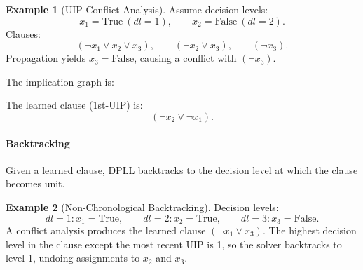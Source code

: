 \documentclass[oneside,11pt,dvipsnames]{book}
\numberwithin{equation}{section}
\theoremstyle{definition}
\newtheorem{example}{Example}[section]
\theoremstyle{remark}
\begin{document}
\begin{example}[UIP Conflict Analysis]
Assume decision levels:
\[
x_1=\mathrm{True} \ (dl=1), \qquad x_2=\mathrm{False}\ (dl=2).
\]
Clauses:
\[
(\lnot x_1 \lor x_2 \lor x_3),\qquad (\lnot x_2 \lor x_3),\qquad (\lnot x_3).
\]
Propagation yields $x_3=\mathrm{False}$, causing a conflict with $(\lnot x_3)$.

The implication graph is:





The learned clause (1st-UIP) is:
\[
(\lnot x_2 \lor \lnot x_1).
\]
\end{example}

\paragraph{Backtracking}


Given a learned clause, DPLL backtracks to the decision level at which the clause
becomes unit.

\begin{example}[Non-Chronological Backtracking]
Decision levels:
\[
dl=1: x_1=\mathrm{True}, \qquad dl=2: x_2=\mathrm{True}, \qquad dl=3: x_3=\mathrm{False}.
\]
A conflict analysis produces the learned clause $(\lnot x_1 \lor x_3)$.
The highest decision level in the clause except the most recent UIP is 1, so the
solver backtracks to level 1, undoing assignments to $x_2$ and $x_3$.
\end{example}
\end{document}
